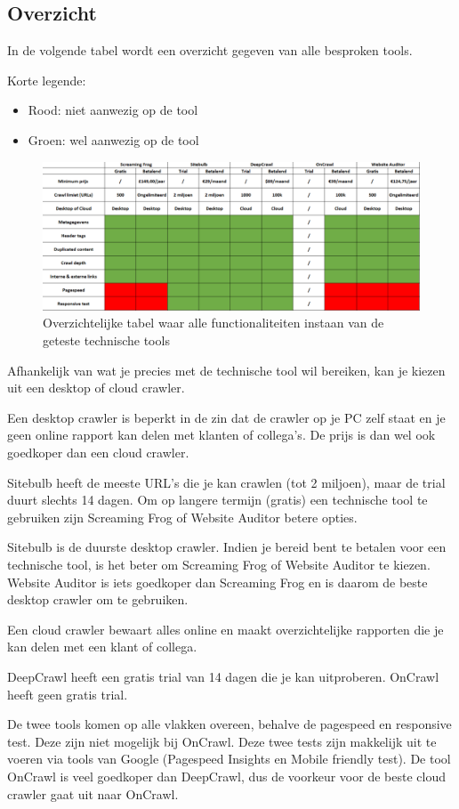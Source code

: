 \subsection{Overzicht}
\label{ch: Overzicht}

In de volgende tabel wordt een overzicht gegeven van alle besproken tools. 

Korte legende: 
\begin{itemize}
\item Rood: niet aanwezig op de tool
\item Groen: wel aanwezig op de tool
\end{itemize}

\begin{figure}[h!]
\centering
\includegraphics[width=\linewidth]{img/Knipsel.PNG}
\caption{Overzichtelijke tabel waar alle functionaliteiten instaan van de geteste technische tools}
\end{figure}

Afhankelijk van wat je precies met de technische tool wil bereiken, kan je kiezen uit een desktop of cloud crawler. 

Een desktop crawler is beperkt in de zin dat de crawler op je PC zelf staat en je geen online rapport kan delen met klanten of collega's. De prijs is dan wel ook goedkoper dan een cloud crawler. 

Sitebulb heeft de meeste URL's die je kan crawlen (tot 2 miljoen), maar de trial duurt slechts 14 dagen. Om op langere termijn (gratis) een technische tool te gebruiken zijn Screaming Frog of Website Auditor betere opties. 

Sitebulb is de duurste desktop crawler. Indien je bereid bent te betalen voor een technische tool, is het beter om Screaming Frog of Website Auditor te kiezen. Website Auditor is iets goedkoper dan Screaming Frog en is daarom de beste desktop crawler om te gebruiken.

Een cloud crawler bewaart alles online en maakt overzichtelijke rapporten die je kan delen met een klant of collega. 

DeepCrawl heeft een gratis trial van 14 dagen die je kan uitproberen. OnCrawl heeft geen gratis trial. 

De twee tools komen op alle vlakken overeen, behalve de pagespeed en responsive test. Deze zijn niet mogelijk bij OnCrawl. Deze twee tests zijn makkelijk uit te voeren via tools van Google (Pagespeed Insights en Mobile friendly test). De tool OnCrawl is veel goedkoper dan DeepCrawl, dus de voorkeur voor de beste cloud crawler gaat uit naar OnCrawl. 